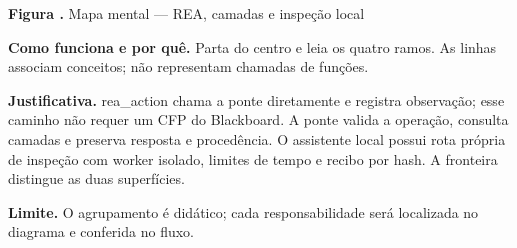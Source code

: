 {\small\textbf{Figura \thefigure.} Mapa mental --- REA, camadas e inspeção local}\par\smallskip
\noindent\textbf{Como funciona e por quê.} Parta do centro e leia os quatro ramos. As linhas associam conceitos; não representam chamadas de funções.\par
\noindent\textbf{Justificativa.} rea\_action chama a ponte diretamente e registra observação; esse caminho não requer um CFP do Blackboard. A ponte valida a operação, consulta camadas e preserva resposta e procedência. O assistente local possui rota própria de inspeção com worker isolado, limites de tempo e recibo por hash. A fronteira distingue as duas superfícies.\par
\noindent\textbf{Limite.} O agrupamento é didático; cada responsabilidade será localizada no diagrama e conferida no fluxo.\par\smallskip
{}
